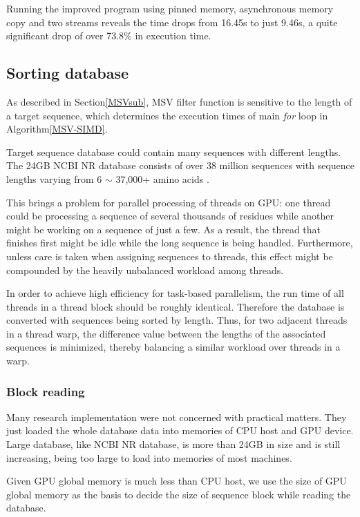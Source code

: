 Running the improved program using pinned memory, asynchronous memory copy and two streams reveals the time drops from 16.45s to just 9.46s, a quite significant drop of over 73.8\% in execution time.

\subsection{Sorting database}
\label{dbsort}
As described in Section\ref{MSVsub}, MSV filter function is sensitive to the length of a target sequence, which determines the execution times of main \emph{for} loop in Algorithm\ref{MSV-SIMD}. 

Target sequence database could contain many sequences with different lengths.  The 24GB NCBI NR database consists of over 38 million sequences with sequence lengths varying from 6 $\sim$ 37,000+ amino acids \citep{NCBI}.

This brings a problem for parallel processing of threads on GPU: one thread could be processing a sequence of several thousands of residues while another might be working on a sequence of just a few. As a result, the thread that finishes first might be idle while the long sequence is being handled. Furthermore, unless care is taken when assigning sequences to threads, this effect might be compounded by the heavily unbalanced workload among threads.

In order to achieve high efficiency for task-based parallelism, the run time of all threads in a thread block should be roughly identical. Therefore the database is converted with sequences being sorted by length. Thus, for two adjacent threads in a thread warp, the difference value between the lengths of the associated sequences is minimized, thereby balancing a similar workload over threads in a warp.

\subsubsection*{Block reading}
Many research implementation were not concerned with practical matters. They just loaded the whole database data into memories of CPU host and GPU device. Large database, like NCBI NR database, is more than 24GB in size and is still increasing, being too large to load into memories of most machines.

Given GPU global memory is much less than CPU host, we use the size of GPU global memory as the basis to decide the size of sequence block while reading the database.

